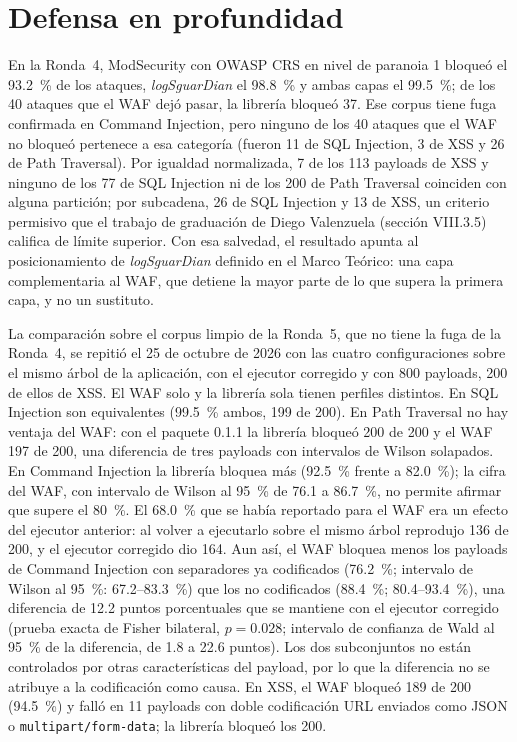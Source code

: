 \section{Defensa en profundidad}
\label{sec:dis-defensa}

En la Ronda~4, ModSecurity con OWASP CRS en nivel de paranoia 1 bloqueó el 93.2~\% de los ataques,
\textit{logSguarDian} el 98.8~\% y ambas capas el 99.5~\%; de los 40 ataques que el WAF dejó pasar,
la librería bloqueó 37. Ese corpus tiene fuga confirmada en Command Injection, pero ninguno de los
40 ataques que el WAF no bloqueó pertenece a esa categoría (fueron 11 de SQL Injection, 3 de XSS y
26 de Path Traversal). Por igualdad normalizada, 7 de los 113 payloads de XSS y ninguno de los 77
de SQL Injection ni de los 200 de Path Traversal coinciden con alguna partición; por subcadena,
26 de SQL Injection y 13 de XSS, un criterio permisivo que el trabajo de graduación de Diego
Valenzuela \cite{valenzuela2026ia} (sección VIII.3.5) califica de límite superior. Con esa salvedad, el resultado apunta al
posicionamiento de \textit{logSguarDian} definido en el Marco Teórico: una capa complementaria al
WAF, que detiene la mayor parte de lo que supera la primera capa, y no un sustituto.

La comparación sobre el corpus limpio de la Ronda~5, que no tiene la fuga de la Ronda~4, se repitió
el 25 de octubre de 2026 con las cuatro configuraciones sobre el mismo árbol de la aplicación, con
el ejecutor corregido y con 800 payloads, 200 de ellos de XSS. El WAF solo y la librería sola tienen
perfiles distintos. En SQL Injection son equivalentes (99.5~\% ambos, 199 de 200). En Path
Traversal no hay ventaja del WAF: con el paquete 0.1.1 la librería bloqueó 200 de 200 y el WAF
197 de 200, una diferencia de tres payloads con intervalos de Wilson solapados. En Command
Injection la librería bloquea más (92.5~\% frente a 82.0~\%); la cifra del WAF, con intervalo de
Wilson al 95~\% de 76.1 a 86.7~\%, no permite afirmar que supere el 80~\%. El 68.0~\% que se había
reportado para el WAF era un efecto del ejecutor anterior: al volver a ejecutarlo sobre el mismo
árbol reprodujo 136 de 200, y el ejecutor corregido dio 164. Aun así, el WAF bloquea menos los
payloads de Command Injection con separadores ya codificados (76.2~\%; intervalo de Wilson al
95~\%: 67.2--83.3~\%) que los no codificados (88.4~\%; 80.4--93.4~\%), una diferencia de 12.2
puntos porcentuales que se mantiene con el ejecutor corregido (prueba exacta de Fisher bilateral,
$p = 0.028$; intervalo de confianza de Wald al 95~\% de la diferencia, de 1.8 a 22.6 puntos). Los
dos subconjuntos no están controlados por otras características del payload, por lo que la
diferencia no se atribuye a la codificación como causa. En XSS, el WAF bloqueó 189 de 200 (94.5~\%) y falló en 11 payloads con doble
codificación URL enviados como JSON o \texttt{multipart/form-data}; la librería bloqueó los 200.

